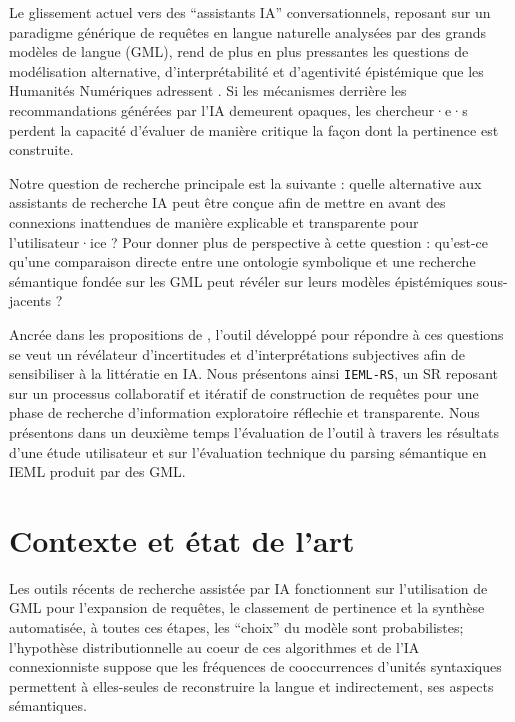 \documentclass[final,fra]{anthology-ch} %
\begin{document}
Le glissement actuel vers des ``assistants IA'' conversationnels,
reposant sur un paradigme générique de requêtes en langue naturelle
analysées par des grands modèles de langue (GML), rend de plus en plus
pressantes les questions de modélisation alternative, d'interprétabilité
et d'agentivité épistémique que les Humanités Numériques adressent
\autocite{goodladEditorsIntroductionHumanities2023,vitali-rosatiManifestePourEtudes2025a}.
Si les mécanismes derrière les recommandations générées par l'IA
demeurent opaques, les chercheur·e·s perdent la capacité d'évaluer de
manière critique la façon dont la pertinence est construite.

Notre question de recherche principale est la suivante : quelle
alternative aux assistants de recherche IA peut être conçue afin de
mettre en avant des connexions inattendues de manière explicable et
transparente pour l'utilisateur·ice ? Pour donner plus de perspective à
cette question : qu'est-ce qu'une comparaison directe entre une
ontologie symbolique et une recherche sémantique fondée sur les GML peut
révéler sur leurs modèles épistémiques sous-jacents ?

Ancrée dans les propositions de
\autocite{druckerPerformativeMaterialityTheoretical2013}, l'outil
développé pour répondre à ces questions se veut un révélateur
d'incertitudes et d'interprétations subjectives afin de sensibiliser à
la littératie en IA. Nous présentons ainsi \texttt{IEML-RS}, un SR
reposant sur un processus collaboratif et itératif de construction de
requêtes pour une phase de recherche d'information exploratoire
réflechie et transparente. Nous présentons dans un deuxième temps
l'évaluation de l'outil à travers les résultats d'une étude utilisateur
et sur l'évaluation technique du parsing sémantique en IEML produit par
des GML.

\section{Contexte et état de l'art}\label{contexte-et-uxe9tat-de-lart}

Les outils récents de recherche assistée par IA fonctionnent sur
l'utilisation de GML pour l'expansion de requêtes, le classement de
pertinence et la synthèse automatisée, à toutes ces étapes, les
``choix'' du modèle sont probabilistes; l'hypothèse distributionnelle
\autocite{firthStudiesLinguisticAnalysis1962,harrisDistributionalStructure1981}
au coeur de ces algorithmes et de l'IA connexionniste suppose que les
fréquences de cooccurrences d'unités syntaxiques permettent à
elles-seules de reconstruire la langue et indirectement, ses aspects
sémantiques.
\end{document}

